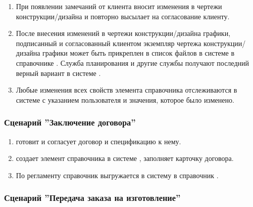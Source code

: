 \begin{enumerate}
\item 	При появлении замечаний от клиента \tehnolog вносит изменения в чертежи конструкции/дизайна и \manager повторно высылает   на согласование клиенту.
\item 	После внесения изменений \tehnolog в чертежи конструкции/дизайна графики, подписанный и согласованный клиентом экземпляр чертежа конструкции/ дизайна графики может быть прикреплен в список файлов в системе \gofro в справочнике . Служба планирования и другие службы получают последний верный вариант  в системе \gofro.
\item 	Любые изменения всех свойств элемента справочника  отслеживаются в системе \gofro с указанием пользователя и значения, которое было изменено.


\end{enumerate}




\subsubsection{Сценарий ''Заключение договора''}
\label{bp:sales_4}

\begin{enumerate}
\item \manager готовит и согласует договор и спецификацию к нему.
\item \manager создает элемент справочника  в системе \gofro, заполняет карточку договора.
\item	По регламенту справочник выгружается в систему \unf в справочник .



\end{enumerate}


\subsubsection{Сценарий ''Передача заказа на изготовление''}
\label{bp:sales_5}


